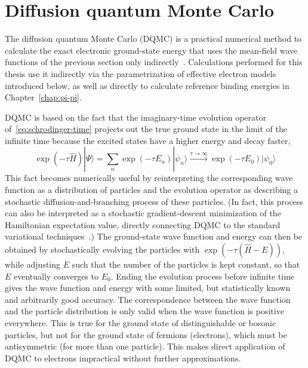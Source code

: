 \section{Diffusion quantum Monte Carlo}\label{sec:dqmc}

The diffusion quantum Monte Carlo (DQMC) is a practical numerical method to calculate the exact electronic ground-state energy that uses the mean-field wave functions of the previous section only indirectly~\cite{FoulkesRMP01}.
Calculations performed for this thesis use it indirectly via the parametrization of effective electron models introduced below, as well as directly to calculate reference binding energies in Chapter~\ref{chap:pi-pi}.

DQMC is based on the fact that the imaginary-time evolution operator of~\eqref{eq:schrodinger-time} projects out the true ground state in the limit of the infinite time because the excited states have a higher energy and decay faster,
\begin{equation}
  \exp(-\tau\hat H)|\Psi\rangle=\sum_n\exp(-\tau E_n)|\psi_n\rangle\xrightarrow{\tau\rightarrow\infty}\exp(-\tau E_0)|\psi_0\rangle
  \label{eq:dqmc}
\end{equation}
This fact becomes numerically useful by reinterpreting the corresponding wave function as a distribution of particles and the evolution operator as describing a stochastic diffusion-and-branching process of these particles.
(In fact, this process can also be interpreted as a stochastic gradient-descent minimization of the Hamiltonian expectation value, directly connecting DQMC to the standard variational techniques~\cite{SchwarzPRL17}.)
The ground-state wave function and energy can then be obtained by stochastically evolving the particles with $\exp(-\tau(\hat H-E))$, while adjusting $E$ such that the number of the particles is kept constant, so that $E$ eventually converges to $E_0$.
Ending the evolution process before infinite time gives the wave function and energy with some limited, but statistically known and arbitrarily good accuracy.
The correspondence between the wave function and the particle distribution is only valid when the wave function is positive everywhere.
This is true for the ground state of distinguishable or bosonic particles, but not for the ground state of fermions (electrons), which must be antisymmetric (for more than one particle).
This makes direct application of DQMC to electrons impractical without further approximations.

